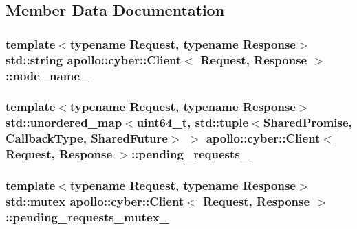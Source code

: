 \subsection{Member Data Documentation}
\hypertarget{classapollo_1_1cyber_1_1Client_a742636a4c7f051463094919eaa9e6165}{
\subsubsection[{node\-\_\-name\-\_\-}]{\setlength{\rightskip}{0pt plus 5cm}template$<$typename Request, typename Response$>$ std\-::string {\bf apollo\-::cyber\-::\-Client}$<$ Request, Response $>$\-::node\-\_\-name\-\_\-\hspace{0.3cm}{\ttfamily [private]}}}\label{classapollo_1_1cyber_1_1Client_a742636a4c7f051463094919eaa9e6165}
\hypertarget{classapollo_1_1cyber_1_1Client_acf3fd35613077fc52bf4706c5ee4b69f}{
\subsubsection[{pending\-\_\-requests\-\_\-}]{\setlength{\rightskip}{0pt plus 5cm}template$<$typename Request, typename Response$>$ std\-::unordered\-\_\-map$<$uint64\-\_\-t, std\-::tuple$<${\bf Shared\-Promise}, {\bf Callback\-Type}, {\bf Shared\-Future}$>$ $>$ {\bf apollo\-::cyber\-::\-Client}$<$ Request, Response $>$\-::pending\-\_\-requests\-\_\-\hspace{0.3cm}{\ttfamily [private]}}}\label{classapollo_1_1cyber_1_1Client_acf3fd35613077fc52bf4706c5ee4b69f}
\hypertarget{classapollo_1_1cyber_1_1Client_a63eaaeb862aaa0ad2d7b2314bfb4fd6e}{
\subsubsection[{pending\-\_\-requests\-\_\-mutex\-\_\-}]{\setlength{\rightskip}{0pt plus 5cm}template$<$typename Request, typename Response$>$ std\-::mutex {\bf apollo\-::cyber\-::\-Client}$<$ Request, Response $>$\-::pending\-\_\-requests\-\_\-mutex\-\_\-\hspace{0.3cm}{\ttfamily [private]}}}\label{classapollo_1_1cyber_1_1Client_a63eaaeb862aaa0ad2d7b2314bfb4fd6e}
